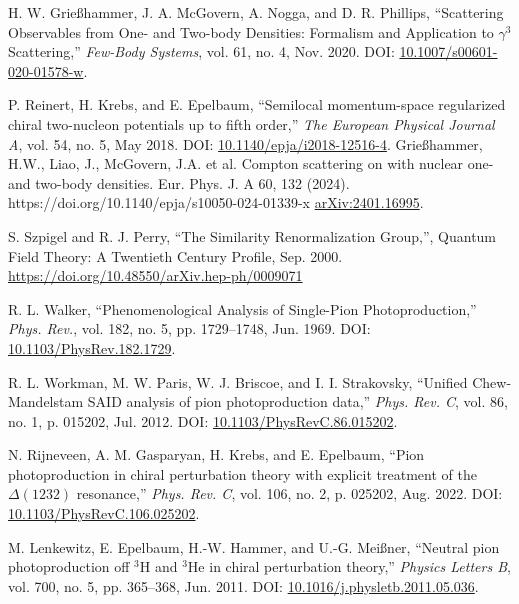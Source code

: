 \documentclass[a4paper,11pt]{article}
\begin{document}
\begin{thebibliography}{99}
  H. W. Grie{\ss}hammer, J. A. McGovern, A. Nogga, and D. R.
  Phillips, ``Scattering Observables from One- and Two-body
  Densities: Formalism and Application to $\gamma^3$ Scattering,''
  \textit{Few-Body Systems}, vol. 61, no. 4, Nov. 2020. DOI:
  \href{https://doi.org/10.1007/s00601-020-01578-w}{10.1007/s00601-020-01578-w}.

  P. Reinert, H. Krebs, and E. Epelbaum, ``Semilocal momentum-space
  regularized chiral two-nucleon potentials up to fifth order,''
  \textit{The European Physical Journal A}, vol. 54, no. 5, May 2018.
  DOI:
  \href{http://dx.doi.org/10.1140/epja/i2018-12516-4}{10.1140/epja/i2018-12516-4}.
Grießhammer, H.W., Liao, J., McGovern, J.A. et al. Compton scattering on 
 with nuclear one- and two-body densities. Eur. Phys. J. A 60, 132 (2024). https://doi.org/10.1140/epja/s10050-024-01339-x
\href{https://arxiv.org/abs/2401.16995}{arXiv:2401.16995}.

S. Szpigel and R. J. Perry, ``The Similarity Renormalization Group,'', Quantum Field Theory: A Twentieth Century Profile,
Sep. 2000. \href{https://doi.org/10.48550/arXiv.hep-ph/0009071}{https://doi.org/10.48550/arXiv.hep-ph/0009071}
  
  R. L. Walker, ``Phenomenological Analysis of Single-Pion
  Photoproduction,'' \textit{Phys. Rev.}, vol. 182, no. 5, pp.
  1729--1748, Jun. 1969. DOI:
  \href{https://link.aps.org/doi/10.1103/PhysRev.182.1729}{10.1103/PhysRev.182.1729}.

  R. L. Workman, M. W. Paris, W. J. Briscoe, and I. I. Strakovsky,
  ``Unified Chew-Mandelstam SAID analysis of pion photoproduction
  data,'' \textit{Phys. Rev. C}, vol. 86, no. 1, p. 015202, Jul.
  2012. DOI:
  \href{https://link.aps.org/doi/10.1103/PhysRevC.86.015202}{10.1103/PhysRevC.86.015202}.

N. Rijneveen, A. M. Gasparyan, H. Krebs, and E. Epelbaum, ``Pion photoproduction in chiral perturbation theory with explicit treatment of the $\Delta(1232)$ resonance,'' \textit{Phys. Rev. C}, vol. 106, no. 2, p. 025202, Aug. 2022. DOI: \href{https://link.aps.org/doi/10.1103/PhysRevC.106.025202}{10.1103/PhysRevC.106.025202}.

  M. Lenkewitz, E. Epelbaum, H.-W. Hammer, and U.-G. Meißner,
  ``Neutral pion photoproduction off $^3$H and $^3$He in chiral
  perturbation theory,'' \textit{Physics Letters B}, vol. 700, no. 5,
  pp. 365–368, Jun. 2011. DOI:
  \href{http://dx.doi.org/10.1016/j.physletb.2011.05.036}{10.1016/j.physletb.2011.05.036}.


\end{thebibliography}
\end{document}
